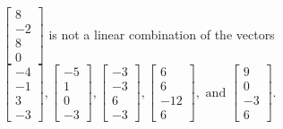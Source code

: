 \begin{exercise}
\begin{exerciseStatement}
  \end{exerciseStatement}
  \begin{exerciseAnswer}
   \(\left[\begin{array}{c}
8 \\
-2 \\
8 \\
0
\end{array}\right]\) 
  	 is not  
	a linear combination of the vectors \(\left[\begin{array}{c}
-4 \\
-1 \\
3 \\
-3
\end{array}\right] , \left[\begin{array}{c}
-5 \\
1 \\
0 \\
-3
\end{array}\right] , \left[\begin{array}{c}
-3 \\
-3 \\
6 \\
-3
\end{array}\right] , \left[\begin{array}{c}
6 \\
6 \\
-12 \\
6
\end{array}\right] , \text{ and } \left[\begin{array}{c}
9 \\
0 \\
-3 \\
6
\end{array}\right]\).

	
  


  \end{exerciseAnswer}
\end{exercise}